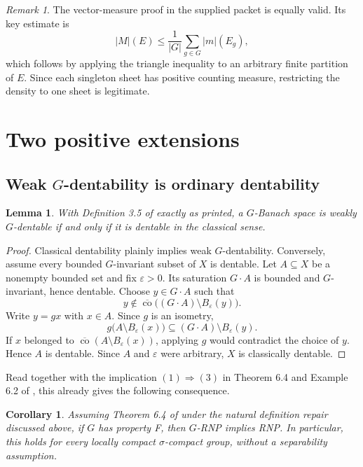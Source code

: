 \documentclass[11pt]{article}
\newtheorem{lemma}[theorem]{Lemma}
\newtheorem{corollary}[theorem]{Corollary}
\theoremstyle{remark}
\newtheorem{remark}[theorem]{Remark}
\newcommand{\co}{\operatorname{co}}
\begin{document}
\begin{remark}
The vector-measure proof in the supplied packet is equally valid.  Its key
estimate is
\[
 |M|(E)\leq \frac1{|G|}\sum_{g\in G}|m|(E_g),
\]
which follows by applying the triangle inequality to an arbitrary finite
partition of $E$.  Since each singleton sheet has positive counting measure,
restricting the density to one sheet is legitimate.
\end{remark}

\section{Two positive extensions}

\subsection{Weak \texorpdfstring{$G$}{G}-dentability is ordinary dentability}

\begin{lemma}\label{lem:weak-collapse}
With Definition 3.5 of \cite{DDJR} exactly as printed, a $G$-Banach space is
weakly $G$-dentable if and only if it is dentable in the classical sense.
\end{lemma}

\begin{proof}
Classical dentability plainly implies weak $G$-dentability.  Conversely,
assume every bounded $G$-invariant subset of $X$ is dentable.  Let
$A\subseteq X$ be a nonempty bounded set and fix $\varepsilon>0$.  Its
saturation $G\cdot A$ is bounded and $G$-invariant, hence dentable.  Choose
$y\in G\cdot A$ such that
\[
 y\notin \overline{\co}\bigl((G\cdot A)\setminus
 B_\varepsilon(y)\bigr).
\]
Write $y=gx$ with $x\in A$.  Since $g$ is an isometry,
\[
 g\bigl(A\setminus B_\varepsilon(x)\bigr)
 \subseteq (G\cdot A)\setminus B_\varepsilon(y).
\]
If $x$ belonged to
$\overline{\co}(A\setminus B_\varepsilon(x))$, applying $g$ would
contradict the choice of $y$.  Hence $A$ is dentable.  Since $A$ and
$\varepsilon$ were arbitrary, $X$ is classically dentable.
\end{proof}

Read together with the implication $(1)\Rightarrow(3)$ in Theorem 6.4 and
Example 6.2 of \cite{DDJR}, this already gives the following consequence.

\begin{corollary}\label{cor:propertyF}
Assuming Theorem 6.4 of \cite{DDJR} under the natural definition repair
discussed above, if $G$ has property F, then $G$-RNP implies RNP.  In
particular, this holds for every locally compact $\sigma$-compact group,
without a separability assumption.
\end{corollary}
\end{document}
